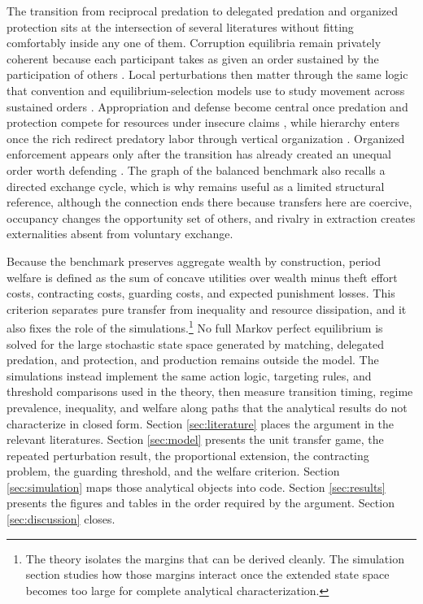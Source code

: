 The transition from reciprocal predation to delegated predation and organized protection sits at the intersection of several literatures without fitting comfortably inside any one of them. Corruption equilibria remain privately coherent because each participant takes as given an order sustained by the participation of others \citep{andvig_moene_1990,bardhan_1997,shleifer_vishny_1993,tirole_1996}. Local perturbations then matter through the same logic that convention and equilibrium-selection models use to study movement across sustained orders \citep{young_1993}. Appropriation and defense become central once predation and protection compete for resources under insecure claims \citep{skaperdas_1992,grossman_kim_1995,hirshleifer_1995}, while hierarchy enters once the rich redirect predatory labor through vertical organization \citep{olsen_torsvik_1998}. Organized enforcement appears only after the transition has already created an unequal order worth defending \citep{olson_1993,north_wallis_weingast_2009,besley_persson_2009,acemoglu_ticchi_vindigni_2011}. The graph of the balanced benchmark also recalls a directed exchange cycle, which is why \citet{shapley_scarf_1974} remains useful as a limited structural reference, although the connection ends there because transfers here are coercive, occupancy changes the opportunity set of others, and rivalry in extraction creates externalities absent from voluntary exchange.

Because the benchmark preserves aggregate wealth by construction, period welfare is defined as the sum of concave utilities over wealth minus theft effort costs, contracting costs, guarding costs, and expected punishment losses. This criterion separates pure transfer from inequality and resource dissipation, and it also fixes the role of the simulations.\footnote{The theory isolates the margins that can be derived cleanly. The simulation section studies how those margins interact once the extended state space becomes too large for complete analytical characterization.} No full Markov perfect equilibrium is solved for the large stochastic state space generated by matching, delegated predation, and protection, and production remains outside the model. The simulations instead implement the same action logic, targeting rules, and threshold comparisons used in the theory, then measure transition timing, regime prevalence, inequality, and welfare along paths that the analytical results do not characterize in closed form. Section \ref{sec:literature} places the argument in the relevant literatures. Section \ref{sec:model} presents the unit transfer game, the repeated perturbation result, the proportional extension, the contracting problem, the guarding threshold, and the welfare criterion. Section \ref{sec:simulation} maps those analytical objects into code. Section \ref{sec:results} presents the figures and tables in the order required by the argument. Section \ref{sec:discussion} closes.
